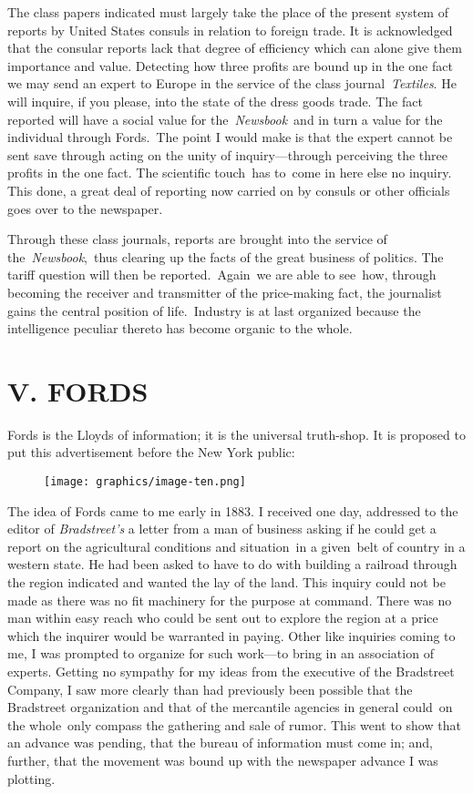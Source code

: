 \documentclass[twoside,symmetric,nobib,justified]{tufte-book}
\begin{document}
The class papers indicated must largely take the place of the present
system of reports by United States consuls in relation to foreign trade.
It is acknowledged that the consular reports lack that degree of
efficiency which can alone give them importance and value. Detecting how
three profits are bound up in the one fact we may send an expert to
Europe in the service of the class journal~\emph{Textiles}. He will
inquire, if you please, into the state of the dress goods trade. The
fact reported will have a social value for the~\emph{Newsbook}~and in
turn a value for the individual through Fords.~The point I would make is
that the expert cannot be sent save through acting on the unity of
inquiry---through perceiving the three profits in the one fact. The
scientific touch~has to~come in here else no inquiry. This done, a great
deal of reporting now carried on by consuls or other officials goes over
to the newspaper.~

\enlargethispage{\baselineskip}

Through these class journals, reports are brought into the service of
the~\emph{Newsbook},~thus clearing up the facts of the great business of
politics. The tariff question will then be reported.~Again~we are able
to see~how, through becoming the receiver and transmitter of the
price-making fact, the journalist gains the central position of
life.~Industry is at last organized because the intelligence peculiar
thereto has become organic to the whole.~~

\hypertarget{v-fords}{%
\section{V. FORDS~}\label{v-fords}}

Fords is the Lloyds of information; it is the universal truth-shop. It is proposed to put this advertisement before the New York public:
\begin{figure}
   \texttt{[image: graphics/image-ten.png]}
   \label{fig:fig10}
\end{figure}

The idea of Fords came to me early in 1883. I received one day,
addressed to the editor of \emph{Bradstreet's} a letter from a man of
business asking if he could get a report on the agricultural conditions
and situation~in a given~belt of country in a western state. He had been
asked to have to do with building a railroad through the region
indicated and wanted the lay of the land. This inquiry could not be made
as there was no fit machinery for the purpose at command. There was no
man within easy reach who could be sent out to explore the region at a
price which the inquirer would be warranted in paying. Other like
inquiries coming to me, I was prompted to organize for such work---to
bring in an association of experts. Getting no sympathy for my ideas
from the executive of the Bradstreet Company, I saw more clearly than
had previously been possible that the Bradstreet organization and that
of the mercantile agencies in general could~on the whole~only compass
the gathering and sale of rumor. This went to show that an advance was
pending, that the bureau of information must come in; and, further, that
the movement was bound up with the newspaper advance I was plotting.~
\end{document}
